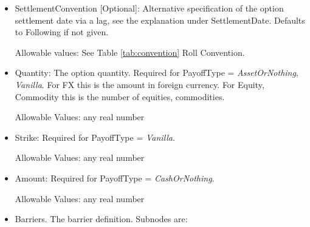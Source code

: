 \begin{itemize}
\item SettlementConvention [Optional]: Alternative specification of the option settlement date via a lag, see the
  explanation under SettlementDate. Defaults to Following if not given.

Allowable values: See Table \ref{tab:convention} Roll Convention.

\item Quantity: The option quantity. Required for PayoffType = \emph{AssetOrNothing}, \emph{Vanilla}. For FX this is the amount in
  foreign currency. For Equity, Commodity this is the number of equities, commodities.

  Allowable Values: any real number

\item Strike: Required for PayoffType = \emph{Vanilla}.

  Allowable Values: any real number

\item Amount: Required for PayoffType = \emph{CashOrNothing}.

  Allowable Values: any real number

\item Barriers. The barrier definition. Subnodes are:


\end{itemize}
